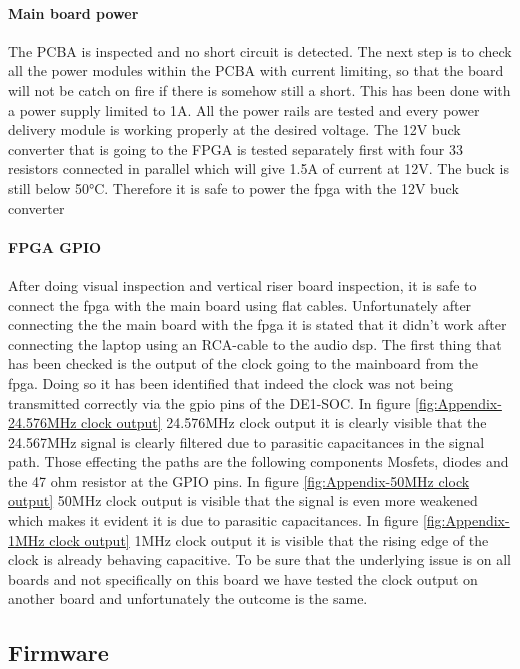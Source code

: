 \paragraph{Main board power}
The PCBA is inspected and no short circuit is detected. The next step is to check all the power modules within the PCBA with current limiting, so that the board will not be catch on fire if there is somehow still a short. This has been done with a power supply limited to 1A. All the power rails are tested and every power delivery module is working properly at the desired voltage. The 12V buck converter that is going to the FPGA is tested separately first with four 33 resistors connected in parallel which will give 1.5A of current at 12V. The buck is still below 50°C. Therefore it is safe to power the fpga with the 12V buck converter

\paragraph{FPGA GPIO}
After doing visual inspection and vertical riser board inspection, it is safe to connect the fpga with the main board using flat cables. Unfortunately after connecting the the main board with the fpga it is stated that it didn't work after connecting the laptop using an RCA-cable to the audio dsp. The first thing that has been checked is the output of the clock going to the mainboard from the fpga. Doing so it has been identified that indeed the clock was not being transmitted correctly via the gpio pins of the DE1-SOC. In figure \ref{fig:Appendix-24.576MHz clock output} 24.576MHz clock output it is clearly visible that the 24.567MHz signal is clearly filtered due to parasitic capacitances in the signal path. Those effecting the paths are the following components Mosfets, diodes and the 47 ohm resistor at the GPIO pins. In figure \ref{fig:Appendix-50MHz clock output} 50MHz clock output is visible that the signal is even more weakened which makes it evident it is due to parasitic capacitances. In figure \ref{fig:Appendix-1MHz clock output} 1MHz clock output it is visible that the rising edge of the clock is already behaving capacitive. To be sure that the underlying issue is on all boards and not specifically on this board we have tested the clock output on another board and unfortunately the outcome is the same.

\subsection{Firmware}

